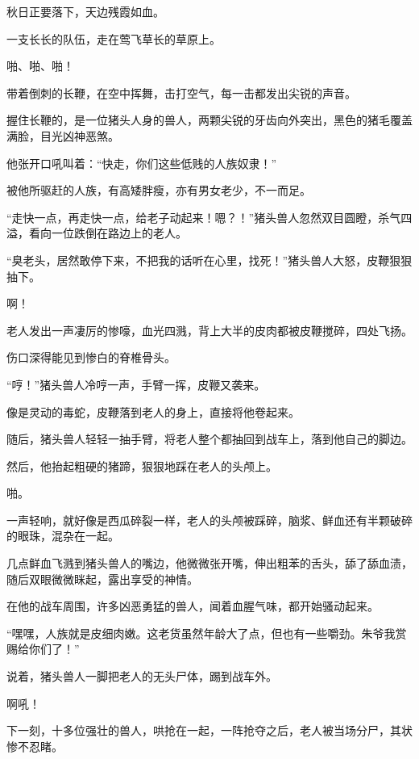 
\begin{this_body}



秋日正要落下，天边残霞如血。

一支长长的队伍，走在莺飞草长的草原上。

啪、啪、啪！

带着倒刺的长鞭，在空中挥舞，击打空气，每一击都发出尖锐的声音。

握住长鞭的，是一位猪头人身的兽人，两颗尖锐的牙齿向外突出，黑色的猪毛覆盖满脸，目光凶神恶煞。

他张开口吼叫着：“快走，你们这些低贱的人族奴隶！”

被他所驱赶的人族，有高矮胖瘦，亦有男女老少，不一而足。

“走快一点，再走快一点，给老子动起来！嗯？！”猪头兽人忽然双目圆瞪，杀气四溢，看向一位跌倒在路边上的老人。

“臭老头，居然敢停下来，不把我的话听在心里，找死！”猪头兽人大怒，皮鞭狠狠抽下。

啊！

老人发出一声凄厉的惨嚎，血光四溅，背上大半的皮肉都被皮鞭搅碎，四处飞扬。

伤口深得能见到惨白的脊椎骨头。

“哼！”猪头兽人冷哼一声，手臂一挥，皮鞭又袭来。

像是灵动的毒蛇，皮鞭落到老人的身上，直接将他卷起来。

随后，猪头兽人轻轻一抽手臂，将老人整个都抽回到战车上，落到他自己的脚边。

然后，他抬起粗硬的猪蹄，狠狠地踩在老人的头颅上。

啪。

一声轻响，就好像是西瓜碎裂一样，老人的头颅被踩碎，脑浆、鲜血还有半颗破碎的眼珠，混杂在一起。

几点鲜血飞溅到猪头兽人的嘴边，他微微张开嘴，伸出粗苯的舌头，舔了舔血渍，随后双眼微微眯起，露出享受的神情。

在他的战车周围，许多凶恶勇猛的兽人，闻着血腥气味，都开始骚动起来。

“嘿嘿，人族就是皮细肉嫩。这老货虽然年龄大了点，但也有一些嚼劲。朱爷我赏赐给你们了！”

说着，猪头兽人一脚把老人的无头尸体，踢到战车外。

啊吼！

下一刻，十多位强壮的兽人，哄抢在一起，一阵抢夺之后，老人被当场分尸，其状惨不忍睹。


\end{this_body}
